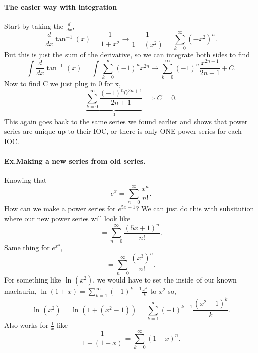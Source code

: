 \begin{exampleblock}{}
	\paragraph{The easier way with integration}
	Start by taking the $ \frac{ d }{ dx }  $,
	\[
	\frac{ d }{ dx } \tan^{ -1 } \left( x \right) = \frac{ 1 }{ 1+x^2 } \to \frac{ 1 }{ 1-\left( x^2 \right)  } = \sum_{ k=0 } ^{ \infty } \left( -x^2 \right) ^{ n }
	.\] 
	But this is just the sum of the derivative, so we can integrate both sides to find
	\[
	\int_{  }^{  } \frac{ d }{ dx } \tan^{ -1 } \left( x \right) =\int_{  }^{  } \sum_{ k=0 } ^{ \infty } \left( -1 \right) ^{ n }x^{ 2n } \to \sum_{ k=0 } ^{ \infty } \left( -1 \right) ^{ n }\frac{ x^{ 2n+1 } }{ 2n+1 }+C
	.\] 
	Now to find C we just plug in 0 for x,
	\[
	\underbrace{ \sum_{ k=0 } ^{ \infty } \frac{ \left( -1 \right) ^{ n }0^{ 2n+1 } }{ 2n+1 } }_{ 0 } \implies C = 0
	.\] 
	This again goes back to the same series we found earlier and shows that power series are unique up to their IOC, or there is only ONE power series for each IOC. 
	\paragraph{Ex.Making a new series from old series.}
	Knowing that \[
	e^{ x }=\sum_{ n=0 } ^{ \infty } \frac{ x^{ n } }{ n! }
	.\] 
	How can we make a power series for $ e^{ 5x+1 } $?
	We can just do this with subsitution where our new power series will look like 
	\[
=	\sum_{ n=0 } ^{ \infty } \frac{ \left( 5x+1 \right) ^{ n } }{ n! }
	.\] 
	Same thing for $ e^{ x^{ 3 } } $,
	\[
	=\sum_{ n=0 } ^{ \infty } \frac{ \left( x^3 \right) ^{ n } }{ n! }
	.\] 
	For something like $ \ln^{  } \left( x^2 \right)  $, we would have to set the inside of our known  maclaurin, $ \ln^{  } \left( 1+x \right) =\sum_{ k=1 } ^{ \infty } \left( -1 \right) ^{ k-1 }\frac{ x^{ k } }{ k } $ to $ x^2 $ so,
	\[
	\ln^{  } \left( x^2 \right) = \ln^{  } \left( 1+\left( x^2-1 \right)  \right) = \sum_{ k=1 } ^{ \infty } \left( -1 \right) ^{ k-1 }\frac{ \left( x^2-1 \right) ^{ k } }{ k }
	.\] 
	Also works for $ \frac{ 1 }{ x }  $ like
	\[
	\frac{ 1 }{ 1-\left( 1-x \right)  } = \sum_{ k=0 } ^{ \infty } \left( 1-x \right) ^{ n }
	.\] 

\end{exampleblock}
